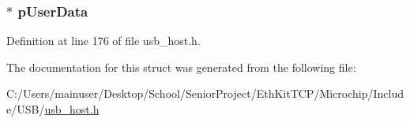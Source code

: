 \subsubsection[{p\+User\+Data}]{$\ast$ p\+User\+Data}\label{struct___h_o_s_t___t_r_a_n_s_f_e_r___d_a_t_a_a219c2ba5becd0223be022280b5a98efe}


Definition at line 176 of file usb\+\_\+host.\+h.



The documentation for this struct was generated from the following file\+:\begin{DoxyCompactItemize}
\item 
C\+:/\+Users/mainuser/\+Desktop/\+School/\+Senior\+Project/\+Eth\+Kit\+T\+C\+P/\+Microchip/\+Include/\+U\+S\+B/\hyperlink{usb__host_8h}{usb\+\_\+host.\+h}\end{DoxyCompactItemize}
